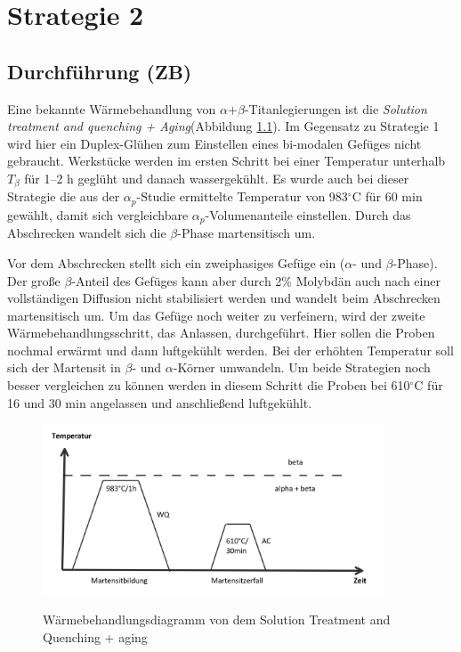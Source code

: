\chapter{Strategie 2}

\section{Durchführung (ZB)}

Eine bekannte Wärmebehandlung von $\alpha$+$\beta$-Titanlegierungen ist die  \textit{Solution treatment and quenching + Aging}(Abbildung \ref{fig:SQ}). Im Gegensatz zu  Strategie 1 wird hier ein Duplex-Glühen zum Einstellen eines bi-modalen Gefüges nicht gebraucht. Werkstücke werden im ersten Schritt bei einer Temperatur unterhalb $T_{\beta}$ für 1--2 h geglüht und danach wassergekühlt. Es wurde auch bei dieser Strategie die aus der $\alpha_p$-Studie ermittelte Temperatur von 983$^\circ$C für 60 min gewählt, damit sich vergleichbare $\alpha_p$-Volumenanteile einstellen. Durch das Abschrecken wandelt sich die $\beta$-Phase martensitisch um.

Vor dem Abschrecken stellt sich ein zweiphasiges Gefüge ein ($\alpha$- und $\beta$-Phase). Der große $\beta$-Anteil des Gefüges kann aber durch 2\% Molybdän auch nach einer vollständigen Diffusion nicht stabilisiert werden und wandelt beim Abschrecken martensitisch um. 
Um das Gefüge noch weiter zu verfeinern, wird der zweite Wärmebehandlungsschritt, das Anlassen, durchgeführt. Hier sollen die Proben nochmal erwärmt und dann luftgekühlt werden. Bei der erhöhten Temperatur soll sich der Martensit in $\beta$- und $\alpha$-Körner umwandeln.
Um beide Strategien noch besser vergleichen zu können werden in diesem Schritt die Proben bei  610$^\circ$C für 16 und 30 min angelassen und anschließend luftgekühlt.

\begin{figure}
	\centering
	{\includegraphics[width=0.9\textwidth]{./Bilder/SQ.png}}
	\caption{Wärmebehandlungsdiagramm von dem Solution Treatment and Quenching + aging}
	\label{fig:SQ}
\end{figure}

